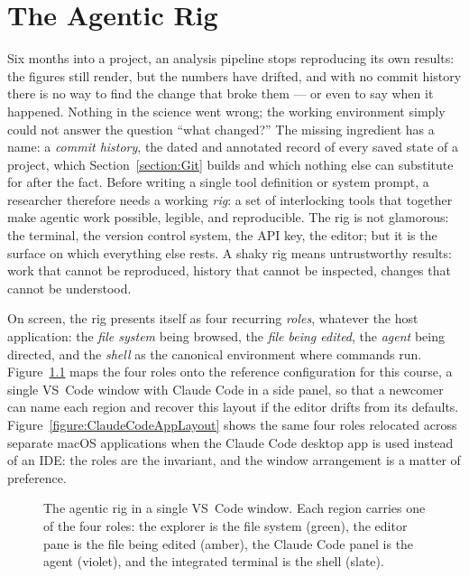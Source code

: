 \chapter{The Agentic Rig}
\label{chapter:AgenticRig}

Six months into a project, an analysis pipeline stops reproducing its own results: the figures still render, but the numbers have drifted, and with no commit history there is no way to find the change that broke them --- or even to say when it happened.
Nothing in the science went wrong; the working environment simply could not answer the question ``what changed?''
The missing ingredient has a name: a \emph{commit history}, the dated and annotated record of every saved state of a project, which Section~\ref{section:Git} builds and which nothing else can substitute for after the fact.
Before writing a single tool definition or system prompt, a researcher therefore needs a working \emph{rig}: a set of interlocking tools that together make agentic work possible, legible, and reproducible.
The rig is not glamorous: the terminal, the version control system, the API key, the editor; but it is the surface on which everything else rests.
A shaky rig means untrustworthy results: work that cannot be reproduced, history that cannot be inspected, changes that cannot be understood.

On screen, the rig presents itself as four recurring \emph{roles}, whatever the host application: the \emph{file system} being browsed, the \emph{file being edited}, the \emph{agent} being directed, and the \emph{shell} as the canonical environment where commands run.
Figure~\ref{figure:VSCodeLayout} maps the four roles onto the reference configuration for this course, a single VS~Code window with Claude Code in a side panel, so that a newcomer can name each region and recover this layout if the editor drifts from its defaults.
Figure~\ref{figure:ClaudeCodeAppLayout} shows the same four roles relocated across separate macOS applications when the Claude Code desktop app is used instead of an IDE: the roles are the invariant, and the window arrangement is a matter of preference.

\begin{figure}[t]
\centering
{\rigfigurefonts}
\caption{The agentic rig in a single VS~Code window.
Each region carries one of the four roles: the explorer is the file system (green), the editor pane is the file being edited (amber), the Claude Code panel is the agent (violet), and the integrated terminal is the shell (slate).}
\label{figure:VSCodeLayout}
\end{figure}

